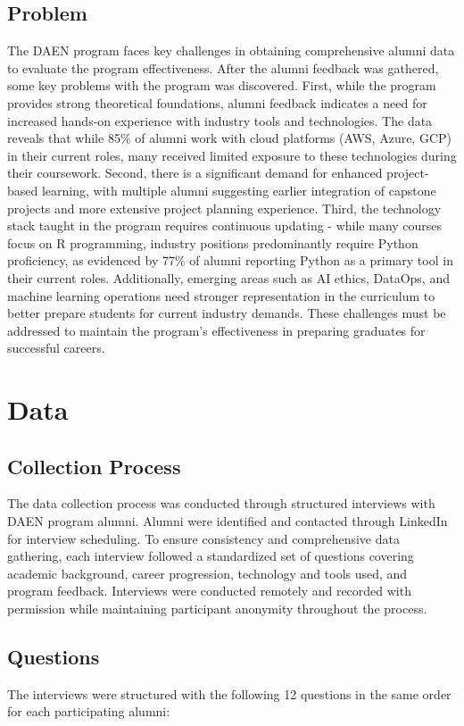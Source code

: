\documentclass[12pt,a4paper]{article}
\begin{document}
\subsection{Problem}
The DAEN program faces key challenges in obtaining comprehensive alumni data to evaluate the program effectiveness. After the alumni feedback was gathered, some key problems with the program was discovered. First, while the program provides strong theoretical foundations, alumni feedback indicates a need for increased hands-on experience with industry tools and technologies. The data reveals that while 85\% of alumni work with cloud platforms (AWS, Azure, GCP) in their current roles, many received limited exposure to these technologies during their coursework. Second, there is a significant demand for enhanced project-based learning, with multiple alumni suggesting earlier integration of capstone projects and more extensive project planning experience. Third, the technology stack taught in the program requires continuous updating - while many courses focus on R programming, industry positions predominantly require Python proficiency, as evidenced by 77\% of alumni reporting Python as a primary tool in their current roles. Additionally, emerging areas such as AI ethics, DataOps, and machine learning operations need stronger representation in the curriculum to better prepare students for current industry demands. These challenges must be addressed to maintain the program's effectiveness in preparing graduates for successful careers.

\section{Data}
\subsection{Collection Process}
The data collection process was conducted through structured interviews with DAEN program alumni. Alumni were identified and contacted through LinkedIn for interview scheduling. To ensure consistency and comprehensive data gathering, each interview followed a standardized set of questions covering academic background, career progression, technology and tools used, and program feedback. Interviews were conducted remotely and recorded with permission while maintaining participant anonymity throughout the process.

\subsection{Questions}
The interviews were structured with the following 12 questions in the same order for each participating alumni:
\end{document}
